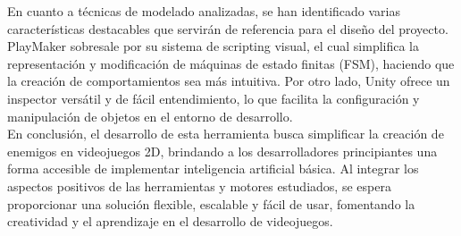 En cuanto a técnicas de modelado analizadas, se han identificado varias características destacables que servirán de referencia para el diseño del proyecto. PlayMaker sobresale por su sistema de scripting visual, el cual simplifica la representación y modificación de máquinas de estado finitas (FSM), haciendo que la creación de comportamientos sea más intuitiva. Por otro lado, Unity ofrece un inspector versátil y de fácil entendimiento, lo que facilita la configuración y manipulación de objetos en el entorno de desarrollo.\\

En conclusión, el desarrollo de esta herramienta busca simplificar la creación de enemigos en videojuegos 2D, brindando a los desarrolladores principiantes una forma accesible de implementar inteligencia artificial básica. Al integrar los aspectos positivos de las herramientas y motores estudiados, se espera proporcionar una solución flexible, escalable y fácil de usar, fomentando la creatividad y el aprendizaje en el desarrollo de videojuegos.\\